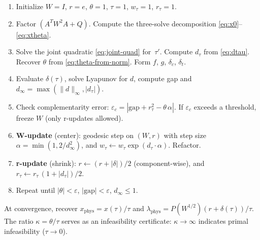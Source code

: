 \documentclass{article}
\newcommand{\PW}{P(W^{1/2})}
\begin{document}
\begin{enumerate}
\item Initialize $W = I$, $r = e$, $\theta = 1$, $\tau = 1$,
      $w_\tau = 1$, $r_\tau = 1$.
\item Factor $(A^T W^2 A + Q)$.  Compute the three-solve decomposition
      \eqref{eq:x0}--\eqref{eq:xtheta}.
\item Solve the joint quadratic \eqref{eq:joint-quad} for~$\tau'$.
      Compute $d_\tau$ from \eqref{eq:dtau}.
      Recover $\theta$ from \eqref{eq:theta-from-norm}.
      Form $f$, $g$, $\delta_c$, $\delta_t$.
\item Evaluate $\delta(\tau)$, solve Lyapunov for $d$, compute gap
      and $d_\infty = \max(\|d\|_\infty, |d_\tau|)$.
\item Check complementarity error:
      $\varepsilon_c = |\text{gap} + r_\tau^2 - \theta\,\alpha|$.
      If $\varepsilon_c$ exceeds a threshold, freeze $W$
      (only r-updates allowed).
\item \textbf{W-update} (center): geodesic step on $(W, r)$
      with step size $\alpha = \min(1, 2/d_\infty^2)$,
      and $w_\tau \gets w_\tau \exp(d_\tau \cdot \alpha)$.
      Refactor.
\item \textbf{r-update} (shrink):
      $r \gets (r + |\delta|)/2$ (component-wise), and
      $r_\tau \gets r_\tau\,(1 + |d_\tau|)/2$.
\item Repeat until $|\theta| < \varepsilon$,
      $|\text{gap}| < \varepsilon$, $d_\infty \leq 1$.
\end{enumerate}

At convergence, recover $x_{\mathrm{phys}} = x(\tau)/\tau$ and
$\lambda_{\mathrm{phys}} = \PW(r + \delta(\tau))/\tau$.
The ratio $\kappa = \theta/\tau$ serves as an infeasibility certificate:
$\kappa \to \infty$ indicates primal infeasibility ($\tau \to 0$).
\end{document}
